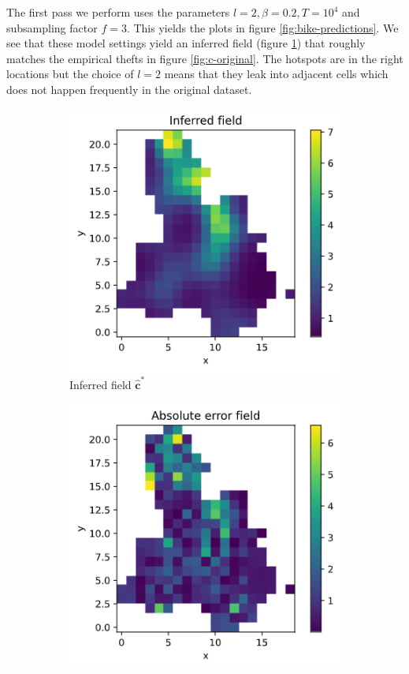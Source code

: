 \documentclass[]{article}
\newcommand{\cbold}{\boldsymbol{c}}
\begin{document}
The first pass we perform uses the parameters $l=2, \beta=0.2, T=10^4$ and subsampling factor $f=3$. This yields the plots in figure \ref{fig:bike-predictions}. We see that these model settings yield an inferred field (figure \ref{fig:c-hat}) that roughly matches the empirical thefts in figure \ref{fig:c-original}. The hotspots are in the right locations but the choice of $l=2$ means that they leak into adjacent cells which does not happen frequently in the original dataset.
%
\begin{figure}[!h]
	\centering
	\begin{subfigure}{0.32\linewidth}
		\includegraphics[width=\linewidth]{c-hat.png}
		\caption{Inferred field $\hat{\cbold}^*$}
		\label{fig:c-hat}
	\end{subfigure}
	\begin{subfigure}{0.32\linewidth}
		\includegraphics[width=\linewidth]{c-err.png}

\end{subfigure}
\end{figure}
\end{document}
